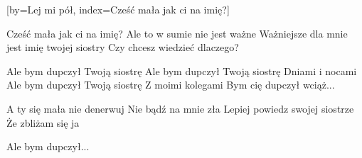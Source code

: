[by={Lej mi pół},
                     index={Cześć mała jak ci na imię?}]
\beginverse

Cześć mała jak ci na imię?
Ale to w sumie nie jest ważne
Ważniejsze dla mnie jest imię twojej siostry
Czy chcesz wiedzieć dlaczego?

\endverse
\beginverse

Ale bym dupczył Twoją siostrę
Ale bym dupczył Twoją siostrę
Dniami i nocami
Ale bym dupczył Twoją siostrę
Z moimi kolegami
Bym cię dupczył wciąż...

\endverse
\beginverse

A ty się mała nie denerwuj
Nie bądź na mnie zła
Lepiej powiedz swojej siostrze
Że zbliżam się ja

\endverse
\beginverse

Ale bym dupczył...

\endverse
\endsong